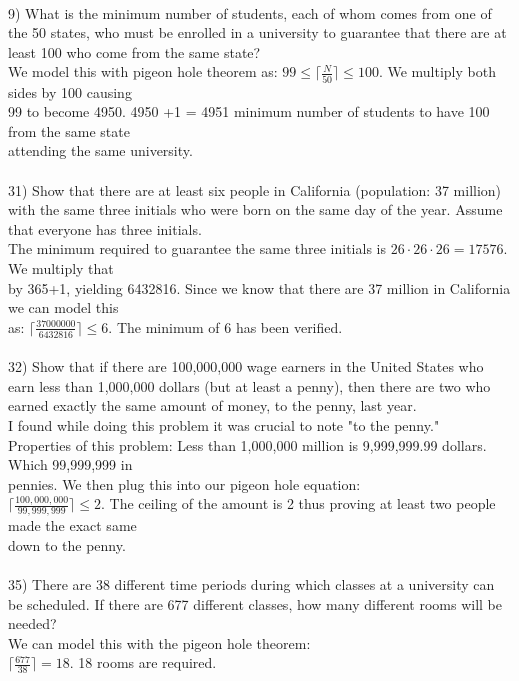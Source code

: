 \documentclass{article}
\begin{document}
\begin{flushleft}
~\\
\setlength\parindent{0pt}9) What is the minimum number of students, each of whom comes from one of the 50 states, who must be enrolled in a university to guarantee that there are at least 100 who come from the same state? \\
\setlength\parindent{24pt}We model this with pigeon hole theorem as: $99 \leq \lceil \frac{N}{50} \rceil \leq 100$.  We multiply both sides by 100 causing \\99 to become 4950.  4950 +1 = 4951 minimum number of students to have 100 from the same state \\attending the same university. \\
~\\
\setlength\parindent{0pt}31) Show that there are at least six people in California (population: 37 million) with the same three initials who were born on the same day of the year.  Assume that everyone has three initials.  \\
\setlength\parindent{24pt} The minimum required to guarantee the same three initials is $26 \cdot 26 \cdot 26 = 17576$.  We multiply that \\by 365+1, yielding 6432816.  Since we know that there are 37 million in California we can model this \\as: $\lceil \frac{37000000}{6432816} \rceil \leq 6$.  The minimum of 6 has been verified.\\
~\\
\setlength\parindent{0pt}32) Show that if there are 100,000,000 wage earners in the United States who earn less than 1,000,000 dollars (but at least a penny), then there are two who earned exactly the same amount of money, to the penny, last year. \\
\setlength\parindent{24pt}I found while doing this problem it was crucial to note "to the penny."  \\
\setlength\parindent{24pt}Properties of this problem: Less than 1,000,000 million is 9,999,999.99 dollars.  Which 99,999,999 in \\pennies.  We then plug this into our pigeon hole equation: \\
$\lceil \frac{100,000,000}{99,999,999} \rceil \leq 2$.  The ceiling of the amount is 2 thus proving at least two people made the exact same \\down to the penny. \\
~\\
\setlength\parindent{0pt}35) There are 38 different time periods during which classes at a university can be scheduled.  If there are 677 different classes, how many different rooms will be needed? \\
\setlength\parindent{24pt} We can model this with the pigeon hole theorem: \\
\setlength\parindent{48pt} $\lceil \frac{677}{38} \rceil = 18$.  18 rooms are required. \\











\end{flushleft}
\end{document}
